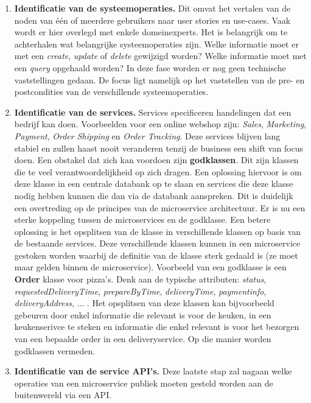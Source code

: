 \documentclass{report}
\begin{document}
	\begin{enumerate}
		\item \textbf{Identificatie van de systeemoperaties.} Dit omvat het vertalen van de noden van één of meerdere gebruikers naar user stories en use-cases. Vaak wordt er hier overlegd met enkele domeinexperts. Het is belangrijk om te achterhalen wat belangrijke systeemoperaties zijn. Welke informatie moet er met een \textit{create}, \textit{update} of \textit{delete} gewijzigd worden? Welke informatie moet met een \textit{query} opgehaald worden? In deze fase worden er nog geen technische vaststellingen gedaan. De focus ligt namelijk op het vaststellen van de pre- en postcondities van de verschillende systeemoperaties.
		
		\item \textbf{Identificatie van de services.} Services specificeren handelingen dat een bedrijf kan doen. Voorbeelden voor een online webshop zijn: \textit{Sales}, \textit{Marketing}, \textit{Payment}, \textit{Order Shipping} en \textit{Order Tracking}. Deze services blijven lang stabiel en zullen haast nooit veranderen tenzij de business een shift van focus doen. Een obstakel dat zich kan voordoen zijn \textbf{godklassen}. Dit zijn klassen die te veel verantwoordelijkheid op zich dragen. Een oplossing hiervoor is om deze klasse in een centrale databank op te slaan en services die deze klasse nodig hebben kunnen die dan via de databank aanspreken. Dit is duidelijk een overtreding op de principes van de microservice architectuur. Er is nu een sterke koppeling tussen de microservices en de godklasse. Een betere oplossing is het opsplitsen van de klasse in verschillende klassen op basis van de bestaande services. Deze verschillende klassen kunnen in een microservice gestoken worden waarbij de definitie van de klasse sterk gedaald is (ze moet maar gelden binnen de microservice). Voorbeeld van een godklasse is een \textbf{Order} klasse voor pizza's. Denk aan de typische attributen: \textit{status}, \textit{requestedDeliveryTime}, \textit{prepareByTime}, \textit{deliveryTime}, \textit{paymentinfo}, \textit{deliveryAddress}, ... . Het opsplitsen van deze klassen kan bijvoorbeeld gebeuren door enkel informatie die relevant is voor de keuken, in een keukenserivce te steken en informatie die enkel relevant is voor het bezorgen van een bepaalde order in een deliveryservice. Op die manier worden godklassen vermeden.
		
		\item \textbf{Identificatie van de service API's.} Deze laatste stap zal nagaan welke operaties van een microservice publiek moeten gesteld worden aan de buitenwereld via een API. 
	\end{enumerate}
\end{document}
